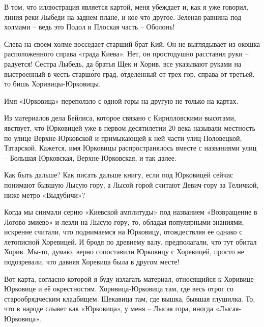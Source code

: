 В том, что иллюстрация является картой, меня убеждает и, как я уже говорил, линия реки Лыбеди на заднем плане, и кое-что другое. Зеленая равнина под холмами – ведь это Подол и Плоская часть – Оболонь!

Слева на своем холме восседает старший брат Кий. Он не выглядывает из окошка расположенного справа «града Киева». Нет, он простодушно расставил руки – радуется! Сестра Лыбедь, да братья Щек и Хорив, все указывают руками на выстроенный в честь старш\'ого град, отделенный от трех гор, справа от третьей, то бишь Хоривицы-Юрковицы.

Имя «Юрковица» переползло с одной горы на другую не только на картах.

Из материалов дела Бейлиса, которое связано с Кирилловскими высотами, явствует, что Юрковицей уже в первом десятилетии 20 века называли местность по улице Верхне-Юрковской и примыкающей к ней части улиц Половецкой, Татарской. Кажется, имя Юрковицы распространялось вместе с названиями улиц – Большая Юрковская, Верхне-Юрковская, и так далее.

Как быть дальше? Как писать дальше книгу, если под Юрковицей сейчас понимают бывшую Лысую гору, а Лысой горой считают Девич-гору за Теличкой, ниже метро «Выдубичи»?


Когда мы снимали серию «Киевской амплитуды» под названием «Возвращение в Логово змиево» и лезли на Лысую гору, то, обладая популярными знаниями, искренне считали, что поднимаемся на Юрковицу, отождествляя ее однако с летописной Хоревицей. И бродя по древнему валу, предполагали, что тут обитал Хорив. Мы-то, думаю, верно сопоставили Юрковицу с Хоревицей, просто не подозревали, что давняя Хоревица была в другом месте!

Вот карта, согласно которой я буду излагать материал, относящийся к Хоривице-Юрковице и её окрестностям. Хоривица-Юрковица там, где весь отрог со старообрядческим кладбищем. Щекавица там, где вышка, бывшая глушилка. То, что в народе слывет как «Юрковица», у меня – Лысая гора, иногда «Лысая-Юрковица».

